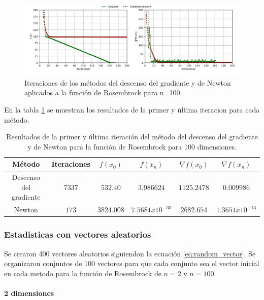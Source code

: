 \begin{figure}[H]
    \centering
    \includegraphics[width=17cm]{Graphics/Problema_2/rosembrock_100_random.png}
    \caption{Iteraciones de los métodos del descenso del gradiente y de Newton aplicados a la función de Rosembrock para n=100.}
    \label{fig:rosembrock_100_random}
\end{figure}

En la tabla \ref{table:rosembrock_100_random} se muestran los resultados de la primer y última iteracion para cada método.

\begin{table}[H]
    \centering
    \begin{tabular}{cccccc} \hline
        Método                 & Iteraciones & $f(x_0)$   & $f(x_n)$          & $\nabla f(x_0)$ & $\nabla f(x_n) $  \\ \hline
        Descenso del gradiente & $7337$      & $532.40 $  & $3.986624$        & $1125.2478$     & $0.009986$        \\
        Newton                 & $173$       & $3824.008$ & $7.5681x10^{-30}$ & $2682.654$      & $1.3651x10^{-13}$ \\ \hline
    \end{tabular}
    \caption{Resultados de la primer y última iteración del método del descenso del gradiente y de Newton para la función de Rosembrock para 100 dimensiones.}
    \label{table:rosembrock_100_random}
\end{table}

\subsubsection{Estadisticas con vectores aleatorios}

Se crearon 400 vectores aleatorios siguiendon la ecuación \ref{eq:random_vector}. Se organizaron conjuntos de 100 vectores para que cada conjunto sea el vector inicial en cada metodo para la función de Rosembrock de $n=2$ y $n=100$.

\paragraph{2 dimensiones}

